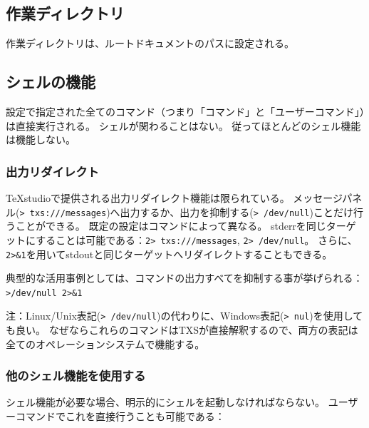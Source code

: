 \subsection{作業ディレクトリ}
作業ディレクトリは、ルートドキュメントのパスに設定される。

\subsection{シェルの機能}
設定で指定された全てのコマンド（つまり「コマンド」と「ユーザーコマンド」）は直接実行される。
シェルが関わることはない。
従ってほとんどのシェル機能は機能しない。

\subsubsection{出力リダイレクト}
TeXstudioで提供される出力リダイレクト機能は限られている。
メッセージパネル(\verb+> txs:///messages+)へ出力するか、出力を抑制する(\verb+> /dev/null+)ことだけ行うことができる。
既定の設定はコマンドによって異なる。
stderrを同じターゲットにすることは可能である：\verb+2> txs:///messages+, \verb+2> /dev/null+。
さらに、\verb+2>&1+を用いてstdoutと同じターゲットへリダイレクトすることもできる。

典型的な活用事例としては、コマンドの出力すべてを抑制する事が挙げられる：\verb+>/dev/null 2>&1+

注：Linux/Unix表記(\verb+> /dev/null+)の代わりに、Windows表記(\verb+> nul+)を使用しても良い。
なぜならこれらのコマンドはTXSが直接解釈するので、両方の表記は全てのオペレーションシステムで機能する。

\subsubsection{他のシェル機能を使用する}

%


シェル機能が必要な場合、明示的にシェルを起動しなければならない。
ユーザーコマンドでこれを直接行うことも可能である：

